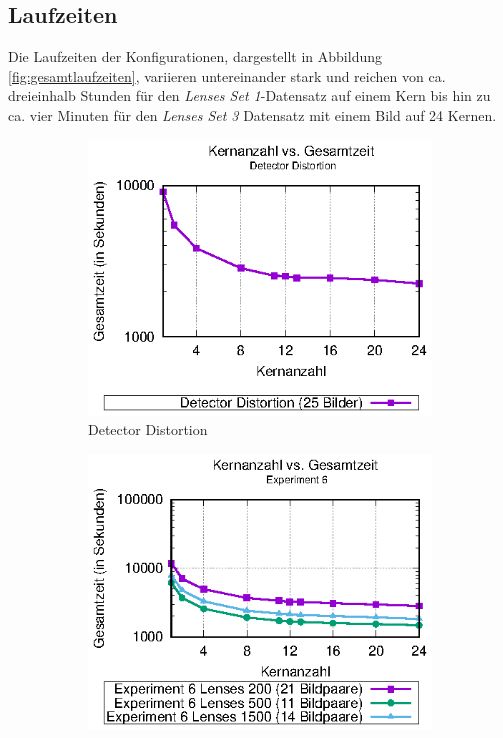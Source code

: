 \subsection{Laufzeiten}

Die Laufzeiten der Konfigurationen, dargestellt in Abbildung \ref{fig:gesamtlaufzeiten},  variieren untereinander stark und reichen von ca. dreieinhalb Stunden für den \textit{Lenses Set 1}-Datensatz auf einem Kern bis hin zu ca. vier Minuten für den \textit{Lenses Set 3} Datensatz mit einem Bild auf 24 Kernen.

\begin{center}
	\begin{figure}[htbp]
		\begin{subfigure}[b]{0.325\textwidth}
			\centering
			\includegraphics[width=\textwidth]{pdf/times_detector_distortion}
			\caption[Detector Distortion]{Detector Distortion}
			\label{fig:times_det_dist}
		\end{subfigure}
		\hfill
		\begin{subfigure}[b]{0.325\textwidth}
			\centering
			\includegraphics[width=\textwidth]{pdf/times_exp6}

\end{subfigure}
\end{figure}
\end{center}
